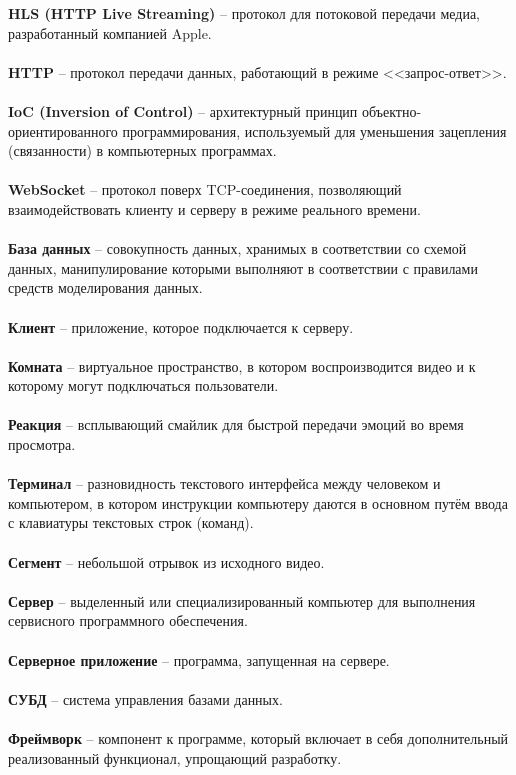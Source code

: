 
\noindent
\textbf{HLS (HTTP Live Streaming)} -- протокол для потоковой передачи медиа, разработанный компанией Apple.\\\\
\textbf{HTTP} -- протокол передачи данных, работающий в режиме <<запрос-ответ>>.\\\\
\textbf{IoC (Inversion of Control)} -- архитектурный принцип объектно-ориентированного программирования, используемый для уменьшения зацепления (связанности) в компьютерных программах.\\\\
\textbf{WebSocket} -- протокол поверх TCP-соединения, позволяющий взаимодействовать клиенту и серверу в режиме реального времени.\\\\
\textbf{База данных} -- совокупность данных, хранимых в соответствии со схемой данных, манипулирование которыми выполняют в соответствии с правилами средств моделирования данных.\\\\
\textbf{Клиент} -- приложение, которое подключается к серверу.\\\\
\textbf{Комната} -- виртуальное пространство, в котором воспроизводится видео и к которому могут подключаться пользователи.\\\\
\textbf{Реакция} -- всплывающий смайлик для быстрой передачи эмоций во время просмотра.\\\\
\textbf{Терминал} -- разновидность текстового интерфейса между человеком и компьютером, в котором инструкции компьютеру даются в основном путём ввода с клавиатуры текстовых строк (команд).\\\\
\textbf{Сегмент} -- небольшой отрывок из исходного видео.\\\\
\textbf{Сервер} -- выделенный или специализированный компьютер для выполнения сервисного программного обеспечения.\\\\
\textbf{Серверное приложение} -- программа, запущенная на сервере.\\\\
\textbf{СУБД} -- система управления базами данных.\\\\
\textbf{Фреймворк} -- компонент к программе, который включает в себя дополнительный реализованный функционал, упрощающий разработку.\\\\